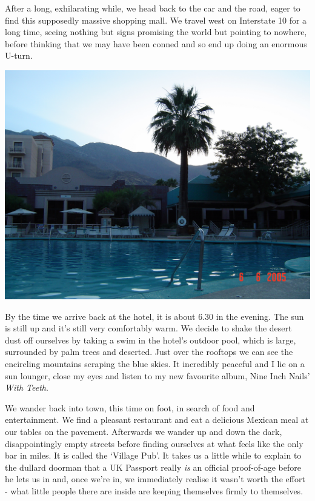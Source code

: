 \documentclass[a5paper,titlepage,11pt]{book}
\begin{document}
After a long, exhilarating while, we head back to the car and the road, eager to find this supposedly massive shopping mall.  We travel west on Interstate 10 for a long time, seeing nothing but signs promising the world but pointing to nowhere, before thinking that we may have been conned and so end up doing an enormous U-turn.

\begin{center}\includegraphics[width=\textwidth]{gfx/palmsprings_pool}\end{center}

By the time we arrive back at the hotel, it is about 6.30 in the evening.  The sun is still up and it's still very comfortably warm.  We decide to shake the desert dust off ourselves by taking a swim in the hotel's outdoor pool, which is large, surrounded by palm trees and deserted.  Just over the rooftops we can see the encircling mountains scraping the blue skies.  It incredibly peaceful and I lie on a sun lounger, close my eyes and listen to my new favourite album, Nine Inch Nails' \emph{With Teeth}.

We wander back into town, this time on foot, in search of food and entertainment.  We find a pleasant restaurant and eat a delicious Mexican meal at our tables on the pavement.  Afterwards we wander up and down the dark, disappointingly empty streets before finding ourselves at what feels like the only bar in miles.  It is called the `Village Pub'.  It takes us a little while to explain to the dullard doorman that a UK Passport really \emph{is} an official proof-of-age before he lets us in and, once we're in, we immediately realise it wasn't worth the effort - what little people there are inside are keeping themselves firmly to themselves.
\end{document}
